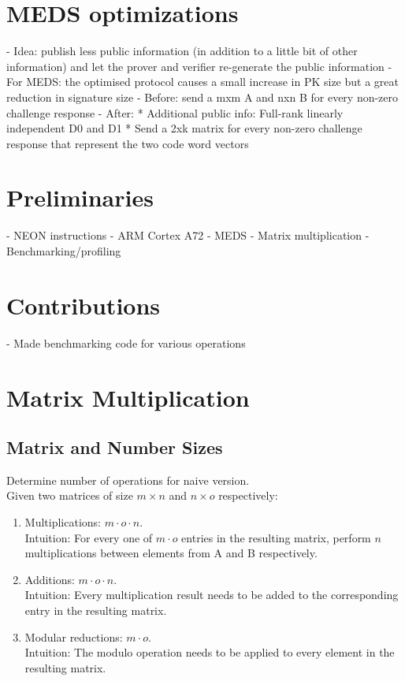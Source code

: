 \documentclass[a4paper]{article}
\begin{document}
\section{MEDS optimizations}
- Idea: publish less public information (in addition to a little bit of other information) and let the prover and verifier re-generate the public information
- For MEDS: the optimised protocol causes a small increase in PK size but a great reduction in signature size
- Before: send a mxm A and nxn B for every non-zero challenge response
- After:
* Additional public info: Full-rank linearly independent D0 and D1
* Send a 2xk matrix for every non-zero challenge response that represent the two code word vectors

\section{Preliminaries}
- NEON instructions
- ARM Cortex A72
- MEDS
- Matrix multiplication
- Benchmarking/profiling

\section{Contributions}
- Made benchmarking code for various operations

\section{Matrix Multiplication}
\subsection{Matrix and Number Sizes}
Determine number of operations for naive version.\\
Given two matrices of size $m \times n$ and $n \times o$ respectively:
\begin{enumerate}
    \item Multiplications: $m \cdot o \cdot n$.\\
    Intuition: For every one of $m \cdot o$ entries in the resulting matrix, perform $n$ multiplications between elements from A and B respectively.
    \item Additions: $m \cdot o \cdot n$.\\
    Intuition: Every multiplication result needs to be added to the corresponding entry in the resulting matrix.
    \item Modular reductions: $m \cdot o$.\\
    Intuition: The modulo operation needs to be applied to every element in the resulting matrix.
\end{enumerate}
\end{document}
